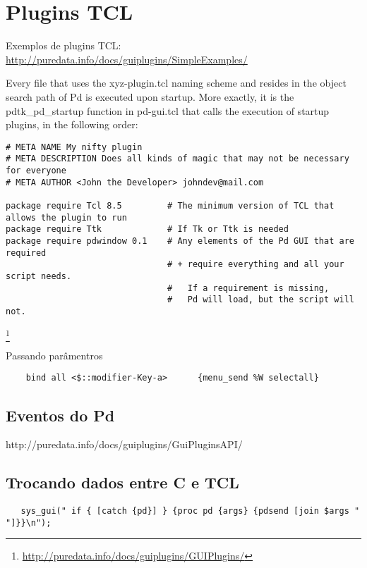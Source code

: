 \chapter{Plugins TCL}
Exemplos de plugins TCL: \url{http://puredata.info/docs/guiplugins/SimpleExamples/}

Every file that uses the xyz-plugin.tcl naming scheme and resides in the object search path of Pd is executed upon startup. More exactly, it is the pdtk\_pd\_startup function in pd-gui.tcl that calls the execution of startup plugins, in the following order:


\begin{lstlisting}
# META NAME My nifty plugin
# META DESCRIPTION Does all kinds of magic that may not be necessary for everyone
# META AUTHOR <John the Developer> johndev@mail.com

package require Tcl 8.5         # The minimum version of TCL that allows the plugin to run
package require Ttk             # If Tk or Ttk is needed
package require pdwindow 0.1    # Any elements of the Pd GUI that are required
                                # + require everything and all your script needs.
                                #   If a requirement is missing,
                                #   Pd will load, but the script will not.
\end{lstlisting}
\footnote{\url{http://puredata.info/docs/guiplugins/GUIPlugins/}}


Passando parâmentros

\begin{lstlisting}
    bind all <$::modifier-Key-a>      {menu_send %W selectall}
\end{lstlisting}

\section{Eventos do Pd}

http://puredata.info/docs/guiplugins/GuiPluginsAPI/

\section{Trocando dados entre C e TCL}

\begin{lstlisting}
   sys_gui(" if { [catch {pd}] } {proc pd {args} {pdsend [join $args " "]}}\n");
\end{lstlisting}




